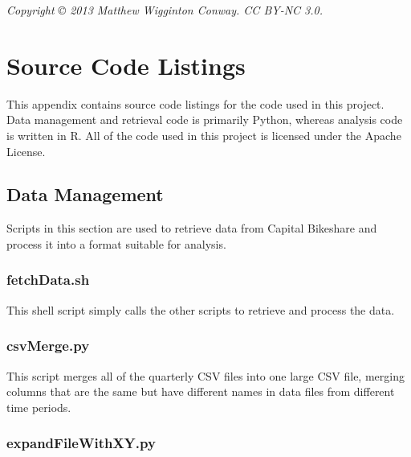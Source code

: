 \documentclass[letterpaper,11pt]{article}
\begin{document}
\clearpage\newpage
\printbibliography

\vspace{25em}

\emph{Copyright © 2013 Matthew Wigginton Conway. CC BY-NC 3.0.}

\newpage
{}
\fancyhfoffset[E,O]{0pt}
\appendix
\section{Source Code Listings}

This appendix contains source code listings for the code used in this
project. Data management and retrieval code is primarily Python,
whereas analysis code is written in R. All of the code used in this
project is licensed under the Apache License.


\subsection{Data Management}

Scripts in this section are used to retrieve data from Capital
Bikeshare and process it into a format suitable for analysis.

\subsubsection{fetchData.sh}
\label{fetchData.sh}

This shell script simply calls the other scripts to retrieve and
process the data.



\subsubsection{csvMerge.py}
\label{csvMerge.py}

This script merges all of the quarterly CSV files into one large CSV
file, merging columns that are the same but have different names in
data files from different time periods.



\subsubsection{expandFileWithXY.py}
\label{expandFileWithXY.py}
\end{document}
